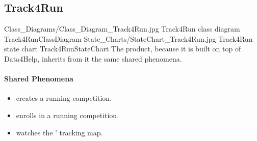\documentclass[../../rasd.tex]{subfiles}
\begin{document}
		\subsection{Track4Run}

			\image {10cm} {Class_Diagrams/Class_Diagram_Track4Run.jpg} {Track4Run class diagram} {Track4RunClassDiagram}
			\image {10cm} {State_Charts/StateChart_Track4Run.jpg} {Track4Run state chart} {Track4RunStateChart}
			The product, because it is built on top of Data4Help, inherits from it the same shared phenomena.

			\paragraph{Shared Phenomena}
			\begin{itemize}
				\item {} creates a running competition.
				\item {} enrolls in a running competition.
				\item {} watches the ' tracking map.		
			\end{itemize}
\end{document}
